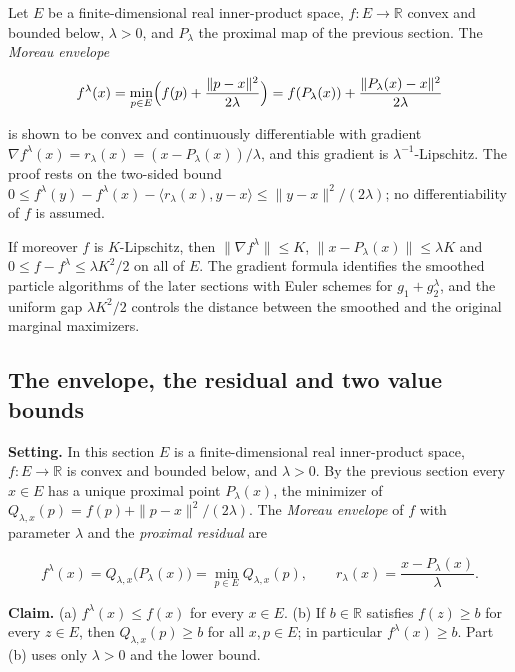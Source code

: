 \documentclass[11pt,a4paper]{report}
\begin{document}
Let \(E\) be a finite-dimensional real inner-product space, \(f:E\to\mathbb R\) convex and bounded below, \(\lambda>0\), and \(P_\lambda\) the proximal map of the previous section. The \emph{Moreau envelope}


\[f^\lambda(x)=\min_{p\in E}\Bigl(f(p)+\frac{\|p-x\|^2}{2\lambda}\Bigr)=f(P_\lambda(x))+\frac{\|P_\lambda(x)-x\|^2}{2\lambda}\]


is shown to be convex and continuously differentiable with gradient \(\nabla f^\lambda(x)=r_\lambda(x)=(x-P_\lambda(x))/\lambda\), and this gradient is \(\lambda^{-1}\)-Lipschitz. The proof rests on the two-sided bound \(0\le f^\lambda(y)-f^\lambda(x)-\langle r_\lambda(x),y-x\rangle\le\|y-x\|^2/(2\lambda)\); no differentiability of \(f\) is assumed.




If moreover \(f\) is \(K\)-Lipschitz, then \(\|\nabla f^\lambda\|\le K\), \(\|x-P_\lambda(x)\|\le\lambda K\) and \(0\le f-f^\lambda\le\lambda K^2/2\) on all of \(E\). The gradient formula identifies the smoothed particle algorithms of the later sections with Euler schemes for \(g_1+g_2^\lambda\), and the uniform gap \(\lambda K^2/2\) controls the distance between the smoothed and the original marginal maximizers.

\subsection{\texorpdfstring{The envelope, the residual and two value bounds}{The envelope, the residual and two value bounds}}
\label{report-step-ProximalLangevin-Moreau-lean-1}


\textbf{Setting.} In this section \(E\) is a finite-dimensional real inner-product space, \(f:E\to\mathbb R\) is convex and bounded below, and \(\lambda>0\). By the previous section every \(x\in E\) has a unique proximal point \(P_\lambda(x)\), the minimizer of \(Q_{\lambda,x}(p)=f(p)+\|p-x\|^2/(2\lambda)\). The \emph{Moreau envelope} of \(f\) with parameter \(\lambda\) and the \emph{proximal residual} are


\[f^\lambda(x)=Q_{\lambda,x}\bigl(P_\lambda(x)\bigr)=\min_{p\in E}Q_{\lambda,x}(p),\qquad r_\lambda(x)=\frac{x-P_\lambda(x)}{\lambda}.\]


\textbf{Claim.} (a) \(f^\lambda(x)\le f(x)\) for every \(x\in E\). (b) If \(b\in\mathbb R\) satisfies \(f(z)\ge b\) for every \(z\in E\), then \(Q_{\lambda,x}(p)\ge b\) for all \(x,p\in E\); in particular \(f^\lambda(x)\ge b\). Part (b) uses only \(\lambda>0\) and the lower bound.
\end{document}
